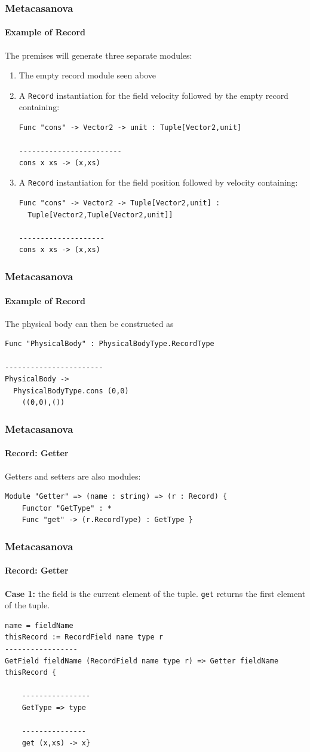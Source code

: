 \documentclass[10pt,a4paper]{beamer}
\begin{document}
\begin{frame}[fragile]
\frametitle{Metacasanova}
\framesubtitle{Example of Record}
The premises will generate three separate modules:

\begin{enumerate}
	\item The empty record module seen above
	\item A \texttt{Record} instantiation for the field velocity followed by the empty record containing:
	\begin{lstlisting}
Func "cons" -> Vector2 -> unit : Tuple[Vector2,unit]

------------------------
cons x xs -> (x,xs)
	\end{lstlisting}
	\item A \texttt{Record} instantiation for the field position followed by velocity containing:
	\begin{lstlisting}
Func "cons" -> Vector2 -> Tuple[Vector2,unit] : 
  Tuple[Vector2,Tuple[Vector2,unit]]

--------------------
cons x xs -> (x,xs)
	\end{lstlisting}
\end{enumerate}

\end{frame}

\begin{frame}[fragile]
\frametitle{Metacasanova}
\framesubtitle{Example of Record}

The physical body can then be constructed as

\begin{lstlisting}
Func "PhysicalBody" : PhysicalBodyType.RecordType

-----------------------
PhysicalBody -> 
  PhysicalBodyType.cons (0,0)
    ((0,0),())
\end{lstlisting}
\end{frame}

\begin{frame}[fragile]
\frametitle{Metacasanova}
\framesubtitle{Record: Getter}

Getters and setters are also modules:
\begin{lstlisting}
Module "Getter" => (name : string) => (r : Record) {
	Functor "GetType" : *
	Func "get" -> (r.RecordType) : GetType }
\end{lstlisting}
\end{frame}

\begin{frame}[fragile]
\frametitle{Metacasanova}
\framesubtitle{Record: Getter}

\textbf{Case 1:} the field is the current element of the tuple. \texttt{get} returns the first element of the tuple.

\begin{lstlisting}
name = fieldName
thisRecord := RecordField name type r
-----------------
GetField fieldName (RecordField name type r) => Getter fieldName thisRecord {

	----------------
	GetType => type
	
	---------------
	get (x,xs) -> x}
\end{lstlisting}
\end{frame}
\end{document}
